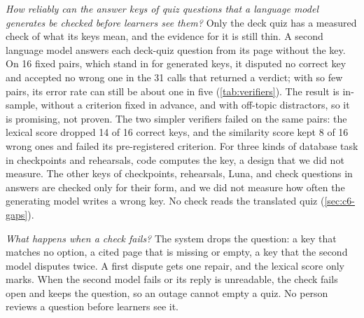 \emph{How reliably can the answer keys of quiz questions that a language model
generates be checked before learners see them?} Only the deck quiz has a
measured check of what its keys mean, and the evidence for it is still thin.
A second language model answers each deck-quiz question from its page without
the key. On 16 fixed pairs, which stand in for generated keys, it disputed no
correct key and accepted no wrong one in the 31 calls that returned a verdict;
with so few pairs, its error rate can still be about one in five
(\cref{tab:verifiers}). The result
is in-sample, without a criterion fixed in advance, and with off-topic
distractors, so it is promising, not proven. The two simpler verifiers failed
on the same pairs: the lexical score dropped 14 of 16 correct keys, and the
similarity score kept 8 of 16 wrong ones and failed its pre-registered
criterion. For three kinds of database task in checkpoints and
rehearsals, code computes the key, a design that we did not measure. The other
keys of checkpoints, rehearsals, Luna, and check questions in answers are
checked only for their form, and
we did not measure how often the generating model writes a wrong key. No
check reads the translated quiz (\cref{sec:c6-gaps}).

\emph{What happens when a check fails?} The system drops the question: a key
that matches no option, a cited page that is missing or empty, a key that the
second model disputes twice. A first dispute gets one repair,
and the lexical score only marks. When the second model fails or its reply is
unreadable, the check fails open and keeps the question, so an outage
cannot empty a quiz. No person reviews a question before learners see it.
